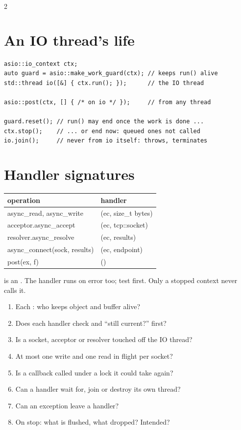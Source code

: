 \begin{multicols}{2}
\section{An IO thread's life}
\begin{lstlisting}
asio::io_context ctx;
auto guard = asio::make_work_guard(ctx); // keeps run() alive
std::thread io([&] { ctx.run(); });      // the IO thread

asio::post(ctx, [] { /* on io */ });     // from any thread

guard.reset(); // run() may end once the work is done ...
ctx.stop();    // ... or end now: queued ones not called
io.join();     // never from io itself: throws, terminates
\end{lstlisting}

\section{Handler signatures}
{\footnotesize
\begin{tabular}{@{}>{\ttfamily}l>{\ttfamily}l@{}}
	\toprule
	\normalfont\bfseries operation & \normalfont\bfseries handler \\ \midrule
	async\_read, async\_write & (ec, size\_t bytes) \\
	acceptor.async\_accept & (ec, tcp::socket) \\
	resolver.async\_resolve & (ec, results) \\
	async\_connect(sock, results) & (ec, endpoint) \\
	post(ex, f) & () \\ \bottomrule
\end{tabular}\par}
\smallskip
{\small {} is an . The handler runs on error too; test  first. Only a stopped context never calls it.}

\begin{keybox}
\begin{enumerate}[leftmargin=12pt]
	\item Each : who keeps object and buffer alive?
	\item Does each handler check  and ``still current?'' first?
	\item Is a socket, acceptor or resolver touched off the IO thread?
	\item At most one write and one read in flight per socket?
	\item Is a callback called under a lock it could take again?
	\item Can a handler wait for, join or destroy its own thread?
	\item Can an exception leave a handler?
	\item On stop: what is flushed, what dropped? Intended?
\end{enumerate}
\end{keybox}
\end{multicols}


